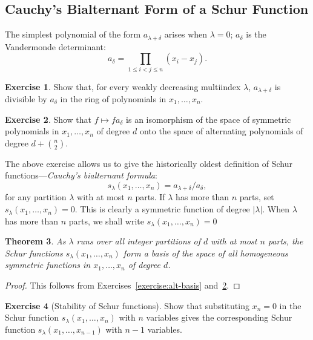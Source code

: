 \documentclass[11pt]{amsart}
\newtheorem{theorem}{Theorem}[subsection]
\theoremstyle{definition}
\theoremstyle{example}
\newtheorem{exercise}[theorem]{Exercise}
\begin{document}
\subsection{Cauchy's Bialternant Form of a Schur Function}
\label{sec:cauchys-bialt-form}
The simplest polynomial of the form $a_{\lambda+\delta}$ arises when $\lambda=0$; $a_\delta$ is the Vandermonde determinant:
\begin{displaymath}
  a_\delta = \prod_{1\leq i<j\leq n}(x_i-x_j).
\end{displaymath}
\begin{exercise}
  Show that, for every weakly decreasing multiindex $\lambda$, $a_{\lambda+\delta}$ is divisible by $a_\delta$ in the ring of polynomials in $x_1,\dotsc,x_n$.
\end{exercise}
\begin{exercise}
  \label{exercise:vandermonde-iso}
  Show that $f\mapsto fa_\delta$ is an isomorphism of the space of symmetric polynomials in $x_1,\dotsc, x_n$ of degree $d$ onto the space of alternating polynomials of degree $d + \binom n2$.
\end{exercise}
The above exercise allows us to give the historically oldest definition of Schur functions---\emph{Cauchy's bialternant formula}:
\begin{equation}
  \label{eq:schur}
  s_\lambda(x_1,\dotsc,x_n) = a_{\lambda+\delta}/a_\delta,
\end{equation}
for any partition $\lambda$ with at most $n$ parts.
If $\lambda$ has more than $n$ parts, set $s_\lambda(x_1,\dotsc,x_n) =0$.
This is clearly a symmetric function of degree $|\lambda|$.
When $\lambda$ has more than $n$ parts, we shall write $s_\lambda(x_1,\dotsc,x_n)=0$
\begin{theorem}
  As $\lambda$ runs over all integer partitions of $d$ with at most $n$ parts, the Schur functions $s_\lambda(x_1,\dotsc,x_n)$ form a basis of the space of all homogeneous symmetric functions in $x_1,\dotsc,x_n$ of degree $d$.
\end{theorem}
\begin{proof}
  This follows from Exercises~\ref{exercise:alt-basis} and~\ref{exercise:vandermonde-iso}.
\end{proof}
\begin{exercise}
  [Stability of Schur functions]
  Show that substituting $x_n=0$ in the Schur function $s_\lambda(x_1,\dotsc, x_n)$ with $n$ variables gives the corresponding Schur function $s_\lambda(x_1,\dotsc,x_{n-1})$ with $n-1$ variables.
\end{exercise}
\end{document}
